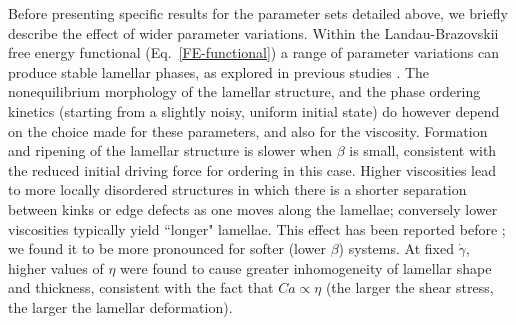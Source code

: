 \documentclass[8.5pt,twoside,twocolumn]{article}
\begin{document}
\label{results2D}
Before presenting specific results for the parameter sets detailed above, we briefly describe the effect of wider parameter variations.
Within the Landau-Brazovskii free energy functional (Eq.~\ref{FE-functional}) a range of parameter variations can produce stable lamellar phases, as explored in previous studies \cite{Kendon01,Kumaran2001,Xu03, Xu06b,Kumaran2011}.
The nonequilibrium morphology of the lamellar structure, and the phase ordering kinetics (starting from a slightly noisy, uniform initial state) do however depend on the choice made for these parameters, and also for the viscosity. 
Formation and ripening of the lamellar structure is slower when $\beta$ is small, consistent with the reduced initial driving force for ordering in this case. Higher viscosities lead to more locally disordered structures in which there is a shorter separation between kinks or edge defects as one moves along the lamellae; conversely lower viscosities typically yield ``longer" lamellae.
This effect has been reported before \cite{Gonnella97}; we found it to be more pronounced for softer (lower $\beta$) systems. At fixed $\dot\gamma$, higher values of $\eta$ were found to cause greater inhomogeneity of lamellar shape and thickness, consistent with the fact that $Ca\propto\eta$ (the larger the shear stress, the larger the lamellar deformation). 
\end{document}
